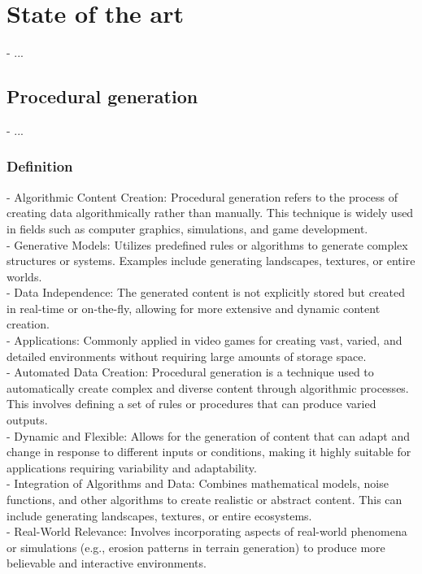 \chapter{State of the art}
\label{chap:state-of-the-art}
\minitoc

- ...

\section{Procedural generation}
\label{sec:state-of-the-art_procedural-generation}
- ...

\subsection{Definition}
- Algorithmic Content Creation: Procedural generation refers to the process of creating data algorithmically rather than manually. This technique is widely used in fields such as computer graphics, simulations, and game development. \\
- Generative Models: Utilizes predefined rules or algorithms to generate complex structures or systems. Examples include generating landscapes, textures, or entire worlds. \\
- Data Independence: The generated content is not explicitly stored but created in real-time or on-the-fly, allowing for more extensive and dynamic content creation. \\
- Applications: Commonly applied in video games for creating vast, varied, and detailed environments without requiring large amounts of storage space. \\
- Automated Data Creation: Procedural generation is a technique used to automatically create complex and diverse content through algorithmic processes. This involves defining a set of rules or procedures that can produce varied outputs. \\
- Dynamic and Flexible: Allows for the generation of content that can adapt and change in response to different inputs or conditions, making it highly suitable for applications requiring variability and adaptability. \\
- Integration of Algorithms and Data: Combines mathematical models, noise functions, and other algorithms to create realistic or abstract content. This can include generating landscapes, textures, or entire ecosystems. \\
- Real-World Relevance: Involves incorporating aspects of real-world phenomena or simulations (e.g., erosion patterns in terrain generation) to produce more believable and interactive environments. \\
